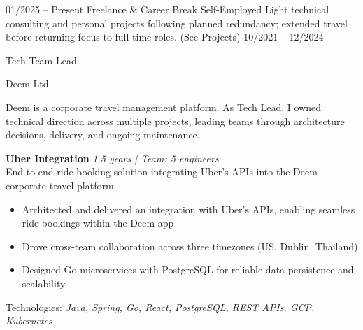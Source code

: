 \documentclass[9pt]{developercv} %
\newif\ifmanager
\begin{document}
    \begin{entrylist}
        \entry
        {01/2025 -- Present}
        {Freelance \& Career Break}
        {Self-Employed}
        {Light technical consulting and personal projects following planned redundancy; extended travel before returning focus to full-time roles. (See Projects)}
        \entry
        {10/2021 -- 12/2024}
        {
            \ifmanager
                Tech Team Lead / Engineering Manager
            \else
                Tech Team Lead
            \fi
        }
        {Deem Ltd}
        {\vspace{-10pt}
        \begin{flushleft}
            \ifmanager
                Deem is a corporate travel management platform. Led technical teams and provided engineering management across multiple high-impact projects, owning delivery, architecture decisions, team development, and stakeholder coordination.
            \else
                Deem is a corporate travel management platform. As Tech Lead, I owned technical direction across multiple projects, leading teams through architecture decisions, delivery, and ongoing maintenance.
            \fi
        \end{flushleft}

        \textbf{Uber Integration} \hfill \textit{1.5 years | Team: 5 engineers}\\
        End-to-end ride booking solution integrating Uber's APIs into the Deem corporate travel platform.
        \begin{itemize}[noitemsep,topsep=0pt,parsep=0pt,partopsep=0pt, leftmargin=15pt]
                \ifmanager
                    \item Led team of 5 engineers to deliver Uber API integration, providing technical direction and removing blockers to enable seamless ride bookings
                    \item Managed cross-functional collaboration across three timezones (US, Dublin, Thailand), coordinating deliverables and stakeholder expectations
                    \item Directed architectural decisions for Go microservices with PostgreSQL, ensuring reliable data persistence and scalability
                \else
                    \item Architected and delivered an integration with Uber's APIs, enabling seamless ride bookings within the Deem app
                    \item Drove cross-team collaboration across three timezones (US, Dublin, Thailand)
                    \item Designed Go microservices with PostgreSQL for reliable data persistence and scalability
                \fi
        \end{itemize}
        \vspace{4pt}
        Technologies: \textit{Java, Spring, Go, React, PostgreSQL, REST APIs, GCP, Kubernetes}
        \vspace{6pt}

}
\end{entrylist}
\end{document}
